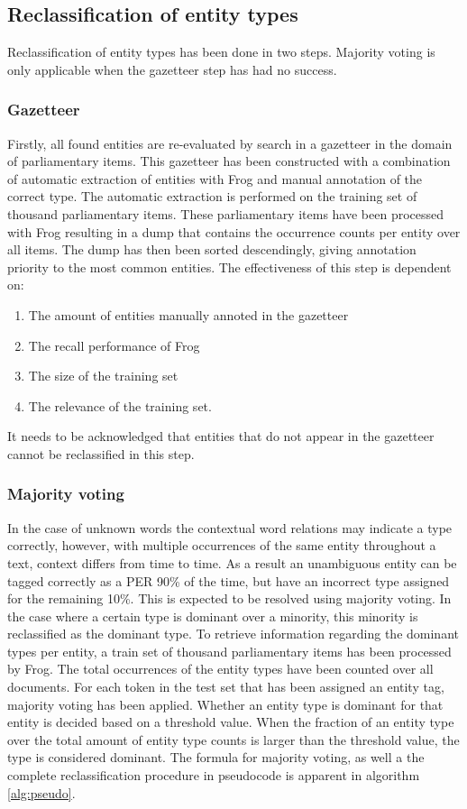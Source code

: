 \subsection{Reclassification of entity types}\label{subsec:reclas}
Reclassification of entity types has been done in two steps. Majority voting is only applicable when the gazetteer step has had no success.
\subsubsection{Gazetteer}
Firstly, all found entities are re-evaluated by search in a gazetteer in the domain of parliamentary items. This gazetteer has been constructed with a combination of automatic extraction of entities with Frog and manual annotation of the correct type. The automatic extraction is performed on the training set of thousand parliamentary items. These parliamentary items have been processed with Frog resulting in a dump that contains the occurrence counts per entity over all items. The dump has then been sorted descendingly, giving annotation priority to the most common entities. The effectiveness of this step is dependent on: 
\begin{enumerate} 
\item The amount of entities manually annoted in the gazetteer
\item The recall performance of Frog 
\item The size of the training set 
\item The relevance of the training set. 
\end{enumerate}
It needs to be acknowledged that entities that do not appear in the gazetteer cannot be reclassified in this step.

\subsubsection{Majority voting}
In the case of unknown words the contextual word relations may indicate a type correctly, however, with multiple occurrences of the same entity throughout a text, context differs from time to time. As a result an unambiguous entity can be tagged correctly as a PER 90\% of the time, but have an incorrect type assigned for the remaining 10\%. This is expected to be resolved using majority voting. In the case where a certain type is dominant over a minority, this minority is reclassified as the dominant type. To retrieve information regarding the dominant types per entity, a train set of thousand parliamentary items has been processed by Frog. The total occurrences of the entity types have been counted over all documents. For each token in the test set that has been assigned an entity tag, majority voting has been applied. Whether an entity type is dominant for that entity is decided based on a threshold value. When the fraction of an entity type over the total amount of entity type counts is larger than the threshold value, the type is considered dominant. The formula for majority voting, as well a the complete reclassification procedure in pseudocode is apparent in algorithm \ref{alg:pseudo}.

